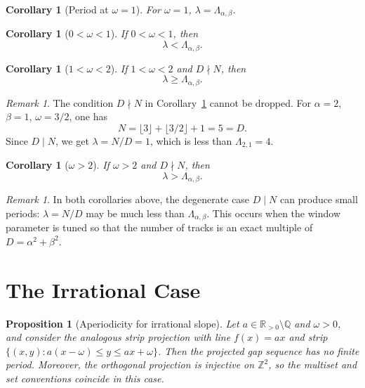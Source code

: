 \documentclass[11pt,reqno]{amsart}
\theoremstyle{plain}
\newtheorem{corollary}[theorem]{Corollary}
\newtheorem{proposition}[theorem]{Proposition}
\theoremstyle{definition}
\theoremstyle{remark}
\newtheorem{remark}[theorem]{Remark}
\begin{document}
\begin{corollary}[Period at \(\omega = 1\)]\label{cor:omega1}
For \(\omega = 1\), \(\lambda = \Lambda_{\alpha,\beta}\).
\end{corollary}

\begin{corollary}[\(0 < \omega < 1\)]\label{cor:small_omega}
If \(0 < \omega < 1\), then
\[
    \lambda < \Lambda_{\alpha,\beta}.
\]
\end{corollary}

\begin{corollary}[\(1 < \omega < 2\)]\label{cor:medium_omega}
If \(1 < \omega < 2\) and \(D \nmid N\), then
\[
    \lambda \ge \Lambda_{\alpha,\beta}.
\]
\end{corollary}

\begin{remark}
The condition \(D \nmid N\) in Corollary~\ref{cor:medium_omega} cannot be
dropped.  For \(\alpha = 2\), \(\beta = 1\), \(\omega = 3/2\), one has
\[
    N = \lfloor 3 \rfloor + \lfloor 3/2 \rfloor + 1 = 5 = D.
\]
Since \(D \mid N\), we get \(\lambda = N/D = 1\), which is less than
\(\Lambda_{2,1} = 4\).
\end{remark}

\begin{corollary}[\(\omega > 2\)]\label{cor:large_omega}
If \(\omega > 2\) and \(D \nmid N\), then
\[
    \lambda > \Lambda_{\alpha,\beta}.
\]
\end{corollary}

\begin{remark}
In both corollaries above, the degenerate case \(D \mid N\) can produce
small periods: \(\lambda = N/D\) may be much less than
\(\Lambda_{\alpha,\beta}\).  This occurs when the window parameter is tuned so
that the number of tracks is an exact multiple of \(D = \alpha^2+\beta^2\).
\end{remark}

\section{The Irrational Case}\label{sec:irrational}

\begin{proposition}[Aperiodicity for irrational slope]\label{prop:irrational}
Let \(a \in \mathbb{R}_{>0} \setminus \mathbb{Q}\) and \(\omega > 0\), and
consider the analogous strip projection with line \(f(x) = a x\) and strip
\(\{(x,y) : a(x-\omega) \le y \le a x + \omega\}\).  Then the projected
gap sequence has \emph{no} finite period.  Moreover, the orthogonal
projection is injective on \(\mathbb{Z}^2\), so the multiset and set
conventions coincide in this case.
\end{proposition}
\end{document}

